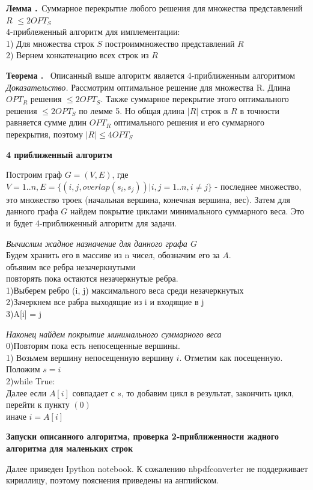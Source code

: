 \documentclass[11pt,a4paper]{article}
\newcommand\ifnonempty[2]{\ifthenelse{\equal{#1}{}}{}{#2}}
\newcounter{thm}
\newcounter{lem}
\newcommand{\thm}[1][]{\smallskip\par\hangafter=1\normalsize\textbf{Теорема \refstepcounter{thm}\thethm\ifnonempty{#1}{ (#1)}.}~}
\newcommand{\lem}[1][]{\smallskip\par\hangafter=1\normalsize\textbf{Лемма \refstepcounter{lem}\thelem\ifnonempty{#1}{ (#1)}.}~}
\begin{document}
\lem Суммарное перекрытие любого решения для множества представлений $R$ $\le 2OPT_S$\\

4-приблеженный алгоритм для имплементации:\\
1) Для множества строк $S$ построиммножество представлений $R$\\
2) Вернем конкатенацию всех строк из $R$\\
\thm
Описанный выше алгоритм является 4-приближенным алгоритмом \\
\textit{Доказательство.} Рассмотрим оптимальное решение для множества R. Длина $OPT_R$ решения $\le 2OPT_S$.
Также суммарное перекрытие этого оптимального решения $\le 2OPT_S$ по лемме 5. Но общая длина $|R|$ строк в $R$
в точности равняется сумме длин $OPT_R$ оптимального решения и его суммарного перекрытия, поэтому $|R| \le 4OPT_S$
\\
\begin{center}
\Large
\textbf{4 приближенный алгоритм}
\normalsize
\end{center}
\par
Построим граф $G = (V, E)$, где $V = 1..n, E = \{(i, j, overlap(s_i, s_j))| i, j = 1..n, i \ne j\}$ - последнее множество,
это множество троек (начальная вершина, конечная вершина, вес). Затем для данного графа $G$ найдем покрытие циклами минимального суммарного веса.
Это и будет 4-приближенный алгоритм для задачи.
\par
\textit{Вычислим жадное назначение для данного графа $G$}
\\
Будем хранить его в массиве из n чисел, обозначим его за $A$.
\\
объявим все ребра незачеркнутыми\\
повторять пока остаются незачеркнутые ребра.\\
1)Выберем ребро (i, j) максимального веса среди незачеркнутых\\
2)Зачеркнем все рабра выходящие из i и входящие в j\\
3)A[i] = j
\par
\textit{Наконец найдем покрытие минимального суммарного веса}\\
0)Повторям пока есть непосещенные вершины.
\\
1) Возьмем вершину непосещенную вершину $i$. Отметим как посещенную. Положим $s = i$\\
2)while True:\\
Далее если $A[i]$ совпадает с $s$, то добавим цикл в результат, закончить цикл, перейти к пункту $(0)$\\
иначе $i = A[i]$
\begin{center}
\Large
\textbf{Запуски описанного алгоритма, проверка 2-приближенности жадного алгоритма для маленьких строк}
\normalsize
\end{center}
Далее приведен Ipython notebook. К сожалению nbpdfconverter не поддерживает кириллицу, поэтому пояснения приведены на английском.
\end{document}
